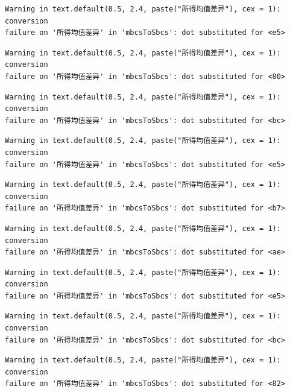 \documentclass[
  letterpaper,
  DIV=11,
  numbers=noendperiod]{scrreprt}
\begin{document}
\begin{verbatim}
Warning in text.default(0.5, 2.4, paste("所得均值差异"), cex = 1): conversion
failure on '所得均值差异' in 'mbcsToSbcs': dot substituted for <e5>
\end{verbatim}

\begin{verbatim}
Warning in text.default(0.5, 2.4, paste("所得均值差异"), cex = 1): conversion
failure on '所得均值差异' in 'mbcsToSbcs': dot substituted for <80>
\end{verbatim}

\begin{verbatim}
Warning in text.default(0.5, 2.4, paste("所得均值差异"), cex = 1): conversion
failure on '所得均值差异' in 'mbcsToSbcs': dot substituted for <bc>
\end{verbatim}

\begin{verbatim}
Warning in text.default(0.5, 2.4, paste("所得均值差异"), cex = 1): conversion
failure on '所得均值差异' in 'mbcsToSbcs': dot substituted for <e5>
\end{verbatim}

\begin{verbatim}
Warning in text.default(0.5, 2.4, paste("所得均值差异"), cex = 1): conversion
failure on '所得均值差异' in 'mbcsToSbcs': dot substituted for <b7>
\end{verbatim}

\begin{verbatim}
Warning in text.default(0.5, 2.4, paste("所得均值差异"), cex = 1): conversion
failure on '所得均值差异' in 'mbcsToSbcs': dot substituted for <ae>
\end{verbatim}

\begin{verbatim}
Warning in text.default(0.5, 2.4, paste("所得均值差异"), cex = 1): conversion
failure on '所得均值差异' in 'mbcsToSbcs': dot substituted for <e5>
\end{verbatim}

\begin{verbatim}
Warning in text.default(0.5, 2.4, paste("所得均值差异"), cex = 1): conversion
failure on '所得均值差异' in 'mbcsToSbcs': dot substituted for <bc>
\end{verbatim}

\begin{verbatim}
Warning in text.default(0.5, 2.4, paste("所得均值差异"), cex = 1): conversion
failure on '所得均值差异' in 'mbcsToSbcs': dot substituted for <82>
\end{verbatim}
\end{document}
